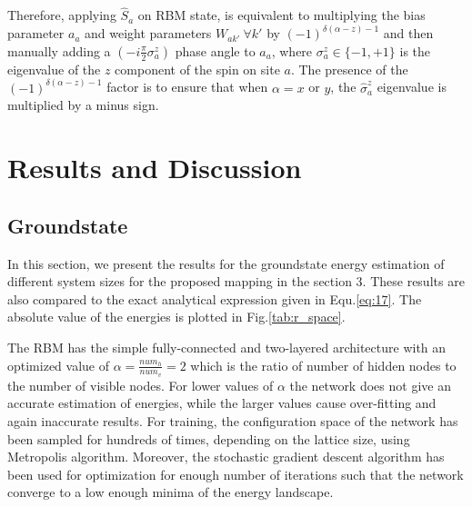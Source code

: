 \documentclass{article}
\begin{document}
Therefore, applying $\hat{S}_a$ on RBM state, is equivalent to multiplying the bias parameter $a_a$ and weight parameters $W_{ak'}~\forall k'$ by $(-1)^{\delta(\alpha-z)-1}$ and then manually adding a $(-i\frac{\pi}{2}\sigma^{z}_a)$ phase angle to $a_a$, where $\sigma^{z}_a \in \{-1,+1\}$ is the eigenvalue of the $z$ component of the spin on site $a$. The presence of the $(-1)^{\delta(\alpha-z)-1}$ factor is to ensure that when $\alpha=x$ or $y$, the $\hat{\sigma}_a^{z}$ eigenvalue is multiplied by a minus sign. 


\section{Results and Discussion}\label{sec5}


\subsection{Groundstate}

In this section, we present the results for the groundstate energy estimation of different system sizes for the proposed mapping in the section 3. These results are also compared to the exact analytical expression given in Equ.\hspace{0.2mm}\ref{eq:17}. The absolute value of the energies is plotted in Fig.\hspace{0.2mm}\ref{tab:r_space}. 

The RBM has the simple fully-connected and two-layered architecture with an optimized value of $\alpha = \frac{num_{h}}{num_{v}} = 2$ which is the ratio of number of hidden nodes to the number of visible nodes. For lower values of $\alpha$ the network does not give an accurate estimation of energies, while the larger values cause over-fitting and again inaccurate results. For training, the configuration space of the network has been sampled for hundreds of  times, depending on the lattice size, using Metropolis algorithm. Moreover, the stochastic gradient descent algorithm has been used for optimization for enough number of iterations such that the network converge to a low enough minima of the energy landscape.
\end{document}
